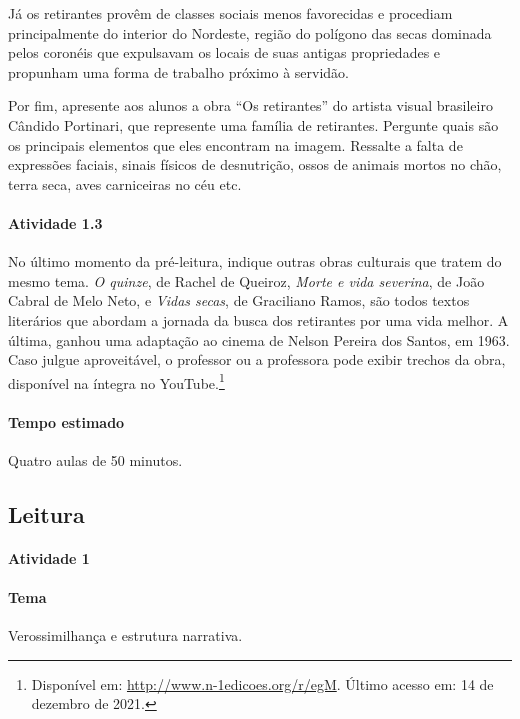 \documentclass[11pt]{extarticle}
\begin{document}
Já os retirantes provêm de classes sociais menos favorecidas e procediam principalmente do interior do 
Nordeste, região do polígono das secas dominada pelos coronéis que expulsavam os locais de suas antigas
propriedades e propunham uma forma de trabalho próximo à servidão. 

Por fim, apresente aos alunos a obra ``Os retirantes'' do artista visual brasileiro Cândido Portinari,
que represente uma família de retirantes. Pergunte quais são os principais elementos que eles encontram
na imagem. Ressalte a falta de expressões faciais, sinais físicos de desnutrição, ossos de animais mortos
no chão, terra seca, aves carniceiras no céu etc.



\paragraph{Atividade 1.3}

No último momento da pré-leitura, indique outras obras culturais que tratem do mesmo tema. 
\textit{O quinze}, de Rachel de Queiroz, \textit{Morte e vida severina}, de João Cabral de Melo Neto, 
e \textit{Vidas secas}, de Graciliano Ramos, são todos textos literários que abordam 
a jornada da busca dos retirantes por uma vida melhor. A última, ganhou uma adaptação ao cinema 
de Nelson Pereira dos Santos, em 1963. Caso julgue aproveitável, o professor ou a professora
pode exibir trechos da obra, disponível na íntegra no YouTube.\footnote{Disponível em: \url{http://www.n-1edicoes.org/r/egM}. Último acesso em: 14 de dezembro de 2021.}

\paragraph{Tempo estimado} Quatro aulas de 50 minutos. 

\subsection{Leitura}


\paragraph{Atividade 1}

\paragraph{Tema} Verossimilhança e estrutura narrativa.
\end{document}
